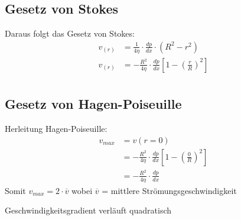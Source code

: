 \documentclass[a4paper,11pt,twoside]{article}
\begin{document}
\pagebreak
\subsection{Gesetz von Stokes}

Daraus folgt das Gesetz von Stokes:
\begin{align*}
v_{(r)} &= \frac{1}{4 \eta} \cdot \frac{dp}{dx} \cdot (R^2-r^2) \\
v_{(r)} &= -\frac{R^2}{4 \eta} \cdot \frac{dp}{dx} \left[1- (\frac{r}{R})^2 \right] \\
\end{align*}




\subsection{Gesetz von Hagen-Poiseuille}

Herleitung Hagen-Poiseuille:
\begin{align*}
v_{max} &= v (r = 0) \\
		&= -\frac{R^2}{4 \eta} \cdot \frac{dp}{dx} \left[1- (\frac{0}{R})^2 \right]  \\
		&= -\frac{R^2}{4 \eta} \cdot \frac{dp}{dx}
\end{align*}
Somit $v_{max} = 2 \cdot \overline{v}$ wobei $\overline{v}$ = mittlere Strömungsgeschwindigkeit \par \hfill \RA Geschwindigkeitsgradient verläuft quadratisch
\end{document}
